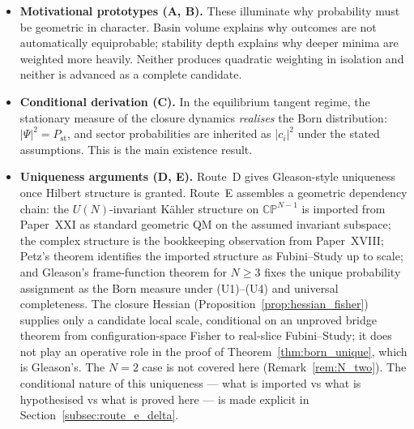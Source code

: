 \documentclass[12pt]{article}
\newcommand{\Pst}{P_{\mathrm{st}}}
\begin{document}
\begin{itemize}
    \item \textbf{Motivational prototypes (A, B).} These illuminate why probability must be geometric in character. Basin volume explains why outcomes are not automatically equiprobable; stability depth explains why deeper minima are weighted more heavily. Neither produces quadratic weighting in isolation and neither is advanced as a complete candidate.
    \item \textbf{Conditional derivation (C).} In the equilibrium tangent regime, the stationary measure of the closure dynamics \emph{realises} the Born distribution: $|\Psi|^2 = \Pst$, and sector probabilities are inherited as $|c_i|^2$ under the stated assumptions. This is the main existence result.
    \item \textbf{Uniqueness arguments (D, E).} Route~D gives Gleason-style uniqueness once Hilbert structure is granted. Route~E assembles a geometric dependency chain: the $U(N)$-invariant K\"ahler structure on $\mathbb{CP}^{N-1}$ is imported from Paper~XXI as standard geometric QM on the assumed invariant subspace; the complex structure is the bookkeeping observation from Paper~XVIII; Petz's theorem identifies the imported structure as Fubini--Study up to scale; and Gleason's frame-function theorem for $N \geq 3$ fixes the unique probability assignment as the Born measure under (U1)--(U4) and universal completeness. The closure Hessian (Proposition~\ref{prop:hessian_fisher}) supplies only a candidate local scale, conditional on an unproved bridge theorem from configuration-space Fisher to real-slice Fubini--Study; it does not play an operative role in the proof of Theorem~\ref{thm:born_unique}, which is Gleason's. The $N = 2$ case is not covered here (Remark~\ref{rem:N_two}). The conditional nature of this uniqueness --- what is imported vs what is hypothesised vs what is proved here --- is made explicit in Section~\ref{subsec:route_e_delta}.
\end{itemize}
\end{document}

